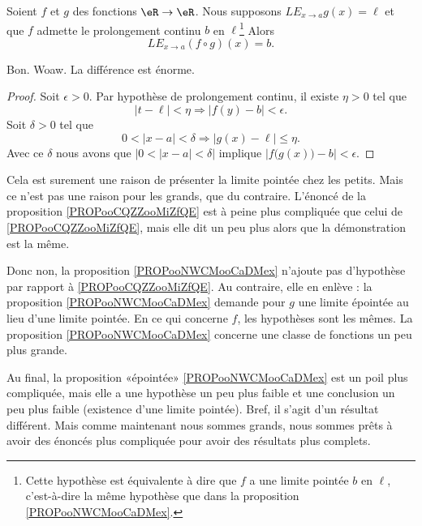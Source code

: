 \begin{proposition}     \label{PROPooNWCMooCaDMex}
    Soient \( f\) et \( g\) des fonctions \( \eR\to \eR\). Nous supposons \( {LE}_{x\to a}g(x)=\ell\) et que \( f\) admette le prolongement continu \(b\) en \( \ell\)\footnote{Cette hypothèse est équivalente à dire que \( f\) a une limite pointée \( b\) en \( \ell\), c'est-à-dire la même hypothèse que dans la proposition \ref{PROPooNWCMooCaDMex}.} Alors
    \begin{equation}
        {LE}_{x\to a}(f\circ g)(x)=b.
    \end{equation}
\end{proposition}
Bon. Woaw. La différence est énorme.

\begin{proof}
    Soit \( \epsilon>0\). Par hypothèse de prolongement continu, il existe \( \eta>0\) tel que
    \begin{equation}
        | t-\ell |<\eta\Rightarrow | f(y)-b |<\epsilon.
    \end{equation}
    Soit \( \delta>0\) tel que
    \begin{equation}
        0<| x-a |<\delta\Rightarrow | g(x)-\ell |\leq \eta.
    \end{equation}
    Avec ce \( \delta\) nous avons que \( | 0<| x-a |<\delta |\) implique \( | f\big( g(x) \big)-b |<\epsilon\).
\end{proof}

Cela est surement une raison de présenter la limite pointée chez les petits. Mais ce n'est pas une raison pour les grands, que du contraire. L'énoncé de la proposition \ref{PROPooCQZZooMiZfQE} est à peine plus compliquée que celui de \ref{PROPooCQZZooMiZfQE}, mais elle dit un peu plus alors que la démonstration est la même.

Donc non, la proposition \ref{PROPooNWCMooCaDMex} n'ajoute pas d'hypothèse par rapport à \ref{PROPooCQZZooMiZfQE}. Au contraire, elle en enlève : la proposition \ref{PROPooNWCMooCaDMex} demande pour \( g\) une limite épointée au lieu d'une limite pointée. En ce qui concerne \( f\), les hypothèses sont les mêmes. La proposition \ref{PROPooNWCMooCaDMex} concerne une classe de fonctions un peu plus grande.

Au final, la proposition «épointée» \ref{PROPooNWCMooCaDMex} est un poil plus compliquée, mais elle a une hypothèse un peu plus faible et une conclusion un peu plus faible (existence d'une limite pointée). Bref, il s'agit d'un résultat différent. Mais comme maintenant nous sommes grands, nous sommes prêts à avoir des énoncés plus compliquée pour avoir des résultats plus complets.

